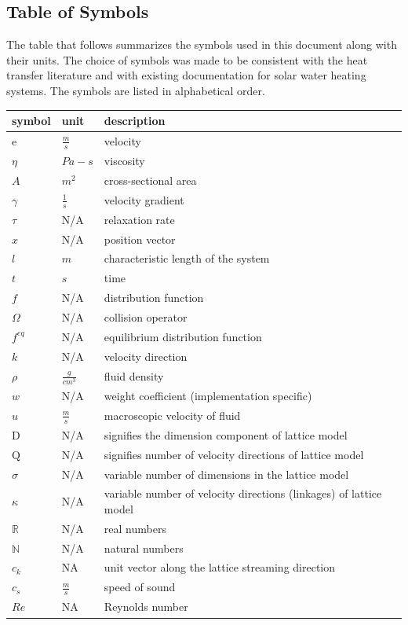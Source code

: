 \documentclass[12pt]{article}
\begin{document}
\subsection{Table of Symbols}

The table that follows summarizes the symbols used in this document along with
their units.  The choice of symbols was made to be consistent with the heat
transfer literature and with existing documentation for solar water heating
systems.  The symbols are listed in alphabetical order.

\renewcommand{\arraystretch}{1.2}
\noindent \begin{longtable*}{l l p{12cm}} \toprule
\textbf{symbol} & \textbf{unit} & \textbf{description}\\
\midrule 
$\mathrm{e}$ & $\frac{m}{s}$ & velocity
\\
$\eta$ & $Pa-s$ & viscosity 
\\ 
$A$ & $m^2$ & cross-sectional area
\\
$\gamma$ & $\frac{1}{s}$ & velocity gradient
\\
$\tau$ & N/A & relaxation rate
\\
$x$ & N/A & position vector
\\
$l$ & $m$ & characteristic length of the system
\\
$t$ & $s$ & time
\\
$f$ & N/A & distribution function
\\
$\Omega$ & N/A & collision operator
\\
$f^{eq}$ & N/A & equilibrium distribution function
\\
$k$ & N/A & velocity direction
\\
$\rho$ & $\frac{g}{cm^3}$ & fluid density
\\
$w$ & N/A & weight coefficient (implementation specific)
\\
$u$ & $\frac{m}{s}$ & macroscopic velocity of fluid
\\
$\mathrm{D}$ & N/A & signifies the dimension component of lattice model
\\
$\mathrm{Q}$ & N/A & signifies number of velocity directions of lattice model
\\
$\sigma$ & N/A & variable number of dimensions in the lattice model
\\
$\kappa$ & N/A & variable number of velocity directions  (linkages) of lattice model
\\
$\mathbb{R}$ & N/A & real numbers
\\
$\mathbb{N}$ & N/A & natural numbers
\\
$c_k$ & NA & unit vector along the lattice streaming direction
\\
$c_s$ & $\frac{m}{s}$ & speed of sound
\\
$Re$ & NA & Reynolds number
\\
\bottomrule
\end{longtable*}
\end{document}

